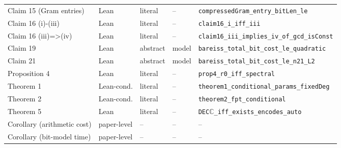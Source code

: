 \begin{tabular}{@{}>{\raggedright\arraybackslash}p{3.9cm}>{\raggedright\arraybackslash}p{1.55cm}>{\raggedright\arraybackslash}p{1.5cm}>{\raggedright\arraybackslash}p{1.5cm}>{\raggedright\arraybackslash}p{7.1cm}@{}}
Claim 15 (Gram entries) & Lean & literal & -- & \texttt{compressedGram\_\allowbreak{}entry\_\allowbreak{}bitLen\_\allowbreak{}le} \\
Claim 16 (i)-(iii) & Lean & literal & -- & \texttt{claim16\_\allowbreak{}i\_\allowbreak{}iff\_\allowbreak{}iii} \\
Claim 16 (iii)=>(iv) & Lean & literal & -- & \texttt{claim16\_\allowbreak{}iii\_\allowbreak{}implies\_\allowbreak{}iv\_\allowbreak{}of\_\allowbreak{}gcd\_\allowbreak{}isConst} \\
Claim 19 & Lean & abstract & model & \texttt{bareiss\_\allowbreak{}total\_\allowbreak{}bit\_\allowbreak{}cost\_\allowbreak{}le\_\allowbreak{}quadratic} \\
Claim 21 & Lean & abstract & model & \texttt{bareiss\_\allowbreak{}total\_\allowbreak{}bit\_\allowbreak{}cost\_\allowbreak{}le\_\allowbreak{}n21\_\allowbreak{}L2} \\
Proposition 4 & Lean & literal & -- & \texttt{prop4\_\allowbreak{}r0\_\allowbreak{}iff\_\allowbreak{}spectral} \\
Theorem 1 & Lean-cond. & literal & -- & \texttt{theorem1\_\allowbreak{}conditional\_\allowbreak{}params\_\allowbreak{}fixedDeg} \\
Theorem 2 & Lean-cond. & literal & -- & \texttt{theorem2\_\allowbreak{}fpt\_\allowbreak{}conditional} \\
Theorem 5 & Lean & literal & -- & \texttt{DEC$\mathbb{C}$\_\allowbreak{}iff\_\allowbreak{}exists\_\allowbreak{}encodes\_\allowbreak{}auto} \\
Corollary (arithmetic cost) & paper-level & -- & -- & -- \\
Corollary (bit-model time) & paper-level & -- & -- & -- \\
\bottomrule
\end{tabular}

